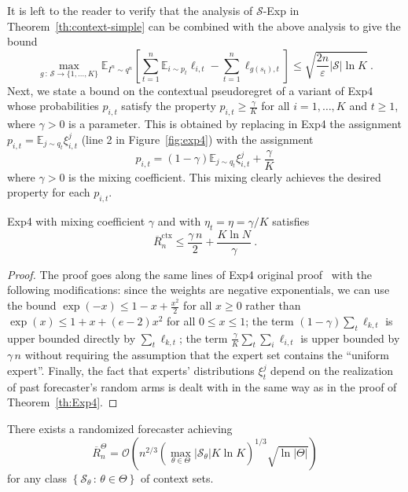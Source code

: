 \documentclass[11pt]{hackednow}
\newcommand{\E}{\mathbb{E}}
\newcommand{\cS}{\mathcal{S}}
\newcommand{\oR}{\overline{R}}
\newcommand{\theset}[2]{\left\{{#1}\,:\,{#2}\right\}}
\newcommand{\ve}{\varepsilon}
\newcommand{\oRx}{\oR^{\mathrm{ctx}}}
\begin{document}
%
It is left to the reader to verify that the analysis of $\cS$-Exp in Theorem~\ref{th:context-simple} can be combined with the above analysis to give the bound
\begin{equation}
\label{eq:exp3-rebel-cont}
    \max_{g \,:\, \cS\to\{1,\dots,K\}} \E_{I^n \sim q^n} \left[ \sum_{t=1}^n \E_{i \sim p_t} \ell_{i,t} - \sum_{t=1}^n \ell_{g(s_t),t} \right] \le
    \sqrt{\frac{2 n}{\ve}|\cS|\ln K}~.
\end{equation}
%
Next, we state a bound on the contextual pseudoregret of a variant of Exp4 whose probabilities $p_{i,t}$ satisfy the property $p_{i,t} \ge \tfrac{\gamma}{K}$ for all $i=1,\dots,K$ and $t \ge 1$, where $\gamma > 0$ is a parameter. This is obtained by replacing in Exp4 the assignment $p_{i,t} = \E_{j \sim q_t} \xi_{i,t}^j$ (line 2 in Figure~\ref{fig:exp4}) with the assignment
\[
	p_{i,t} = (1-\gamma)\E_{j \sim q_t} \xi_{i,t}^j + \frac{\gamma}{K}
\]
where $\gamma > 0$ is the mixing coefficient. This mixing clearly achieves the desired property for each $p_{i,t}$.
%
\begin{theorem}
\label{th:exp4-mixing}
Exp4 with mixing coefficient $\gamma$ and with $\eta_t = \eta = \gamma/K$ satisfies
\begin{equation}
\label{eq:exp4bound-mix}
	\oRx_n \le \frac{\gamma\,n}{2} + \frac{K\ln N}{\gamma}~.
\end{equation}
\end{theorem}
%
\begin{proof}
The proof goes along the same lines of Exp4 original proof~\cite[Theorem~7.1]{ACFS03} with the following modifications: since the weights are negative exponentials, we can use the bound $\exp(-x) \le 1 - x + \tfrac{x^2}{2}$ for all $x \ge 0$ rather than $\exp(x) \le 1 + x + (e-2)x^2$ for all $0 \le x \le 1$; the term $(1-\gamma)\sum_t\ell_{k,t}$ is upper bounded directly by $\sum_t\ell_{k,t}$; the term $\tfrac{\gamma}{K}\sum_t\sum_i \ell_{i,t}$ is upper bounded by $\gamma\,n$ without requiring the assumption that the expert set contains the ``uniform expert''. Finally, the fact that experts' distributions $\xi_t^j$ depend on the realization of past forecaster's random arms is dealt with in the same way as in the proof of Theorem~\ref{th:Exp4}.
\end{proof}
%
\begin{theorem}
\label{th:theta-regret}
There exists a randomized forecaster achieving
\[
	\oR^{\Theta}_n = \mathcal{O}\left(n^{2/3}\left(\max_{\theta\in\Theta}|\cS_{\theta}|K\ln K\right)^{1/3}\sqrt{\ln|\Theta|}\right)
\]
for any class $\theset{\cS_{\theta}}{\theta\in\Theta}$ of context sets.
\end{theorem}
\end{document}
